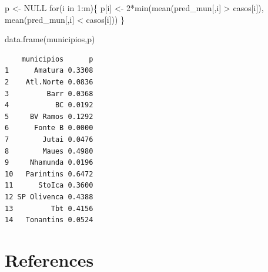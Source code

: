 \documentclass[
  letterpaper,
  DIV=11,
  numbers=noendperiod]{scrreprt}
\newenvironment{Shaded}{\begin{snugshade}}{\end{snugshade}}
\newcommand{\ConstantTok}[1]{\textcolor[rgb]{0.56,0.35,0.01}{#1}}
\newcommand{\ControlFlowTok}[1]{\textcolor[rgb]{0.00,0.23,0.31}{#1}}
\newcommand{\DecValTok}[1]{\textcolor[rgb]{0.68,0.00,0.00}{#1}}
\newcommand{\FunctionTok}[1]{\textcolor[rgb]{0.28,0.35,0.67}{#1}}
\newcommand{\NormalTok}[1]{\textcolor[rgb]{0.00,0.23,0.31}{#1}}
\newcommand{\OtherTok}[1]{\textcolor[rgb]{0.00,0.23,0.31}{#1}}
\newcommand{\SpecialCharTok}[1]{\textcolor[rgb]{0.37,0.37,0.37}{#1}}
\newlength{\cslhangindent}
\newlength{\cslentryspacingunit} %
\newenvironment{CSLReferences}[2] %
 {%
  \setlength{\parindent}{0pt}
  \ifodd #1
  \let\oldpar\par
  \def\par{\hangindent=\cslhangindent\oldpar}
  \fi
  \setlength{\parskip}{#2\cslentryspacingunit}
 }%
 {}
\theoremstyle{definition}
\theoremstyle{definition}
\theoremstyle{remark}
\begin{document}
\begin{Shaded}
\begin{Highlighting}[]
\NormalTok{p }\OtherTok{\textless{}{-}} \ConstantTok{NULL}
\ControlFlowTok{for}\NormalTok{(i }\ControlFlowTok{in} \DecValTok{1}\SpecialCharTok{:}\NormalTok{m)\{}
\NormalTok{p[i] }\OtherTok{\textless{}{-}} \DecValTok{2}\SpecialCharTok{*}\FunctionTok{min}\NormalTok{(}\FunctionTok{mean}\NormalTok{(pred\_mun[,i] }\SpecialCharTok{\textgreater{}}\NormalTok{ casos[i]),}
\FunctionTok{mean}\NormalTok{(pred\_mun[,i] }\SpecialCharTok{\textless{}}\NormalTok{ casos[i]))}
\NormalTok{\}}

\FunctionTok{data.frame}\NormalTok{(municipios,p)}
\end{Highlighting}
\end{Shaded}

\begin{verbatim}
    municipios      p
1      Amatura 0.3308
2    Atl.Norte 0.0836
3         Barr 0.0368
4           BC 0.0192
5     BV Ramos 0.1292
6      Fonte B 0.0000
7        Jutai 0.0476
8        Maues 0.4980
9     Nhamunda 0.0196
10   Parintins 0.6472
11      StoIca 0.3600
12 SP Olivenca 0.4388
13         Tbt 0.4156
14   Tonantins 0.0524
\end{verbatim}


\hypertarget{references}{%
\chapter*{References}\label{references}}


\hypertarget{refs}{}
\begin{CSLReferences}{0}{0}
\end{CSLReferences}
\end{document}
